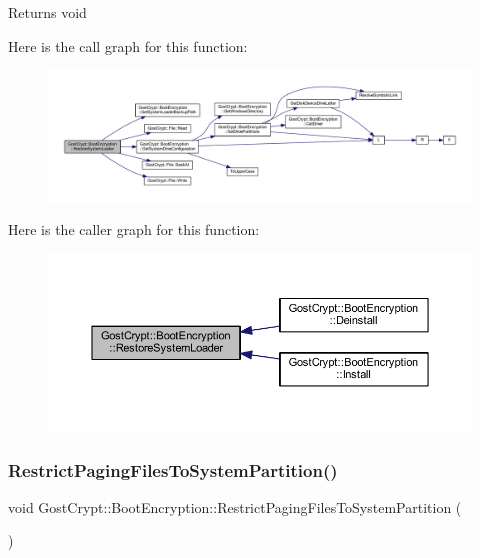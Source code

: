 \begin{DoxyReturn}{Returns}
void 
\end{DoxyReturn}
Here is the call graph for this function\+:
\nopagebreak
\begin{figure}[H]
\begin{center}
\leavevmode
\includegraphics[width=350pt]{class_gost_crypt_1_1_boot_encryption_aadfca881f52d27e0f6bf271702194da3_cgraph}
\end{center}
\end{figure}
Here is the caller graph for this function\+:
\nopagebreak
\begin{figure}[H]
\begin{center}
\leavevmode
\includegraphics[width=350pt]{class_gost_crypt_1_1_boot_encryption_aadfca881f52d27e0f6bf271702194da3_icgraph}
\end{center}
\end{figure}
\mbox{\label{class_gost_crypt_1_1_boot_encryption_abb09defd16cb166c11b788d591241571}} 
\subsubsection{\texorpdfstring{Restrict\+Paging\+Files\+To\+System\+Partition()}{RestrictPagingFilesToSystemPartition()}}
{\footnotesize\ttfamily void Gost\+Crypt\+::\+Boot\+Encryption\+::\+Restrict\+Paging\+Files\+To\+System\+Partition (\begin{DoxyParamCaption}{ }\end{DoxyParamCaption})}



